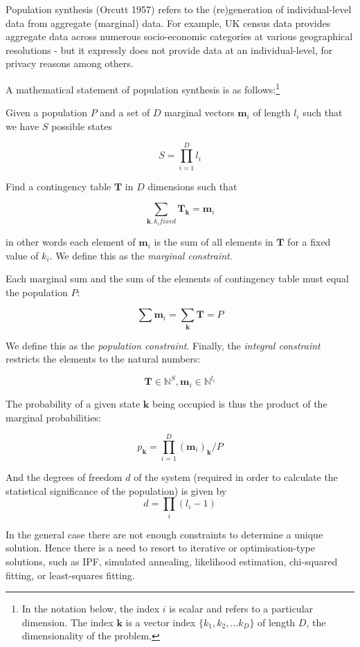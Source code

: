 \documentclass[]{article}
\let\rmarkdownfootnote\footnote%
\def\footnote{\protect\rmarkdownfootnote}
\begin{document}
Population synthesis (Orcutt 1957) refers to the (re)generation of
individual-level data from aggregate (marginal) data. For example, UK
census data provides aggregate data across numerous socio-economic
categories at various geographical resolutions - but it expressly does
not provide data at an individual-level, for privacy reasons among
others.

A mathematical statement of population synthesis is as
follows:\footnote{In the notation below, the index \(i\) is scalar and
  refers to a particular dimension. The index \(\mathbf{k}\) is a vector
  index \(\{k_1, k_2,...k_D\}\) of length \(D\), the dimensionality of
  the problem.}

Given a population \(P\) and a set of \(D\) marginal vectors
\(\mathbf{m}_i\) of length \(l_i\) such that we have \(S\) possible
states

\[S=\prod\limits_{i=1}^{D}l_i\]

Find a contingency table \(\mathbf T\) in \(D\) dimensions such that

\[\sum\limits_{\mathbf{k}, k_i fixed} \mathbf{T}_\mathbf{k} = \mathbf{m}_i\]

in other words each element of \(\mathbf{m}_i\) is the sum of all
elements in \(\mathbf{T}\) for a fixed value of \(k_i\). We define this
as the \emph{marginal constraint}.

Each marginal sum and the sum of the elements of contingency table must
equal the population \(P\):

\[\sum\limits \mathbf{m}_{i} = \sum\limits_\mathbf{k} \mathbf{T} = P\]

We define this as the \emph{population constraint}. Finally, the
\emph{integral constraint} restricts the elements to the natural
numbers:

\[{\mathbf{T} \in \mathbb{N}^S,\mathbf{m}_i} \in \mathbb{N}^{l_i}\]

The probability of a given state \(\mathbf{k}\) being occupied is thus
the product of the marginal probabilities:

\[p_{\mathbf{k}} = \prod\limits_{i=1}^{D}(\mathbf{m}_i)_\mathbf{k}/P\]

And the degrees of freedom \(d\) of the system (required in order to
calculate the statistical significance of the population) is given by
\[d=\prod\limits_{i}(l_i-1)\]

In the general case there are not enough constraints to determine a
unique solution. Hence there is a need to resort to iterative or
optimisation-type solutions, such as IPF, simulated annealing,
likelihood estimation, chi-squared fitting, or least-squares fitting.
\end{document}
